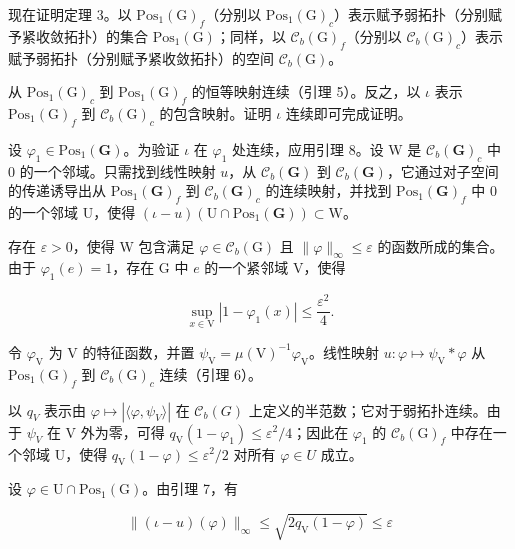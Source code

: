 现在证明定理 3。以 \(\mathrm{Pos}_{1}(\mathrm{G})_{f}\)（分别以 \(\mathrm{Pos}_{1}(\mathrm{G})_{c}\)）表示赋予弱拓扑（分别赋予紧收敛拓扑）的集合 \(\mathrm{Pos}_{1}(\mathrm{G})\)；同样，以 \(\mathcal{C}_{b}(\mathrm{G})_{f}\)（分别以 \(\mathcal{C}_{b}(\mathrm{G})_{c}\)）表示赋予弱拓扑（分别赋予紧收敛拓扑）的空间 \(\mathcal{C}_{b}(\mathrm{G})\)。

从 \(\mathrm{Pos}_{1}(\mathrm{G})_{c}\) 到 \(\mathrm{Pos}_{1}(\mathrm{G})_{f}\) 的恒等映射连续（引理 5）。反之，以 \(\iota\) 表示 \(\mathrm{Pos}_{1}(\mathrm{G})_{f}\) 到 \(\mathcal{C}_{b}(\mathrm{G})_{c}\) 的包含映射。证明 \(\iota\) 连续即可完成证明。

设 \(\varphi_{1} \in \mathrm{Pos}_{1}(\mathbf{G})\)。为验证 \(\iota\) 在 \(\varphi_{1}\) 处连续，应用引理 8。设 W 是 \(\mathcal{C}_{b}(\mathbf{G})_{c}\) 中 0 的一个邻域。只需找到线性映射 \(u\)，从 \(\mathcal{C}_{b}(\mathbf{G})\) 到 \(\mathcal{C}_{b}(\mathbf{G})\)，它通过对子空间的传递诱导出从 \(\mathrm{Pos}_{1}(\mathbf{G})_{f}\) 到 \(\mathcal{C}_{b}(\mathbf{G})_{c}\) 的连续映射，并找到 \(\mathrm{Pos}_{1}(\mathbf{G})_{f}\) 中 0 的一个邻域 U，使得 \((\iota - u)(\mathrm{U} \cap \mathrm{Pos}_{1}(\mathbf{G})) \subset \mathrm{W}\)。

存在 \(\varepsilon > 0\)，使得 W 包含满足 \(\varphi \in \mathcal{C}_b(\mathrm{G})\) 且 \(\| \varphi \|_{\infty} \leqslant \varepsilon\) 的函数所成的集合。由于 \(\varphi_1(e) = 1\)，存在 G 中 \(e\) 的一个紧邻域 V，使得

\[
\sup _ {x \in \mathrm{V}} | 1 - \varphi_ {1} (x) | \leqslant \frac {\varepsilon^ {2}}{4}.
\]

令 \(\varphi_{\mathrm{V}}\) 为 V 的特征函数，并置 \(\psi_{\mathrm{V}} = \mu (\mathrm{V})^{-1}\varphi_{\mathrm{V}}\)。线性映射 \(u\colon \varphi \mapsto \psi_{\mathrm{V}}*\varphi\) 从 \(\mathrm{Pos}_1(\mathrm{G})_f\) 到 \(\mathcal{C}_b(\mathrm{G})_c\) 连续（引理 6）。

以 \(q_{V}\) 表示由 \(\varphi\mapsto|\langle\varphi,\psi_{V}\rangle|\) 在 \(\mathcal{C}_{b}(G)\) 上定义的半范数；它对于弱拓扑连续。由于 \(\psi_{V}\) 在 V 外为零，可得 \(q_{\mathrm{V}}(1-\varphi_{1})\leqslant\varepsilon^{2}/4\)；因此在 \(\varphi_{1}\) 的 \(\mathcal{C}_{b}(\mathrm{G})_{f}\) 中存在一个邻域 U，使得 \(q_{\mathrm{V}}(1-\varphi)\leqslant\varepsilon^{2}/2\) 对所有 \(\varphi\in U\) 成立。

设 \(\varphi\in\mathrm{U}\cap\mathrm{Pos}_{1}(\mathrm{G})\)。由引理 7，有

\[
\| (\iota - u) (\varphi) \| _ {\infty} \leqslant \sqrt {2 q _ {\mathrm{V}} (1 - \varphi)} \leqslant \varepsilon
\]

